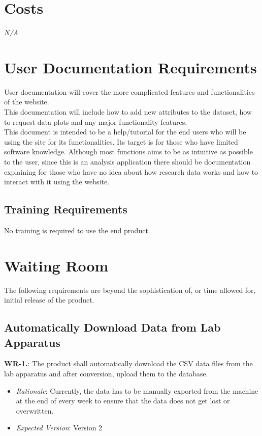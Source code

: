 \documentclass[12pt]{article}
\begin{document}
\section{Costs}
\emph{N/A}
\section{User Documentation Requirements}
User documentation will cover the more complicated features and functionalities of the website.\\

\noindent This documentation will include how to add new attributes to the dataset, how
to request data plots and any major functionality features.\\ \newline
This document is intended to be a help/tutorial for the end users who will be
using the site for its functionalities. Its target is for those who have limited
software knowledge. Although most functions aims to be as intuitive as possible
to the user, since this is an analysis application there should be documentation
explaining for those who have no idea about how research data works and how to
interact with it using the website.

\subsection{Training Requirements}
No training is required to use the end product.
\section{Waiting Room}
The following requirements are beyond the sophistication of, or time allowed for, initial release of the product.
\subsection{Automatically Download Data from Lab Apparatus}
\textbf{WR-1.}: The product shall automatically download the CSV data files from the lab apparatus and after conversion, upload them to the database.
\begin{itemize}
  \item \emph{Rationale}: Currently, the data has to be manually exported from the machine at the end of every week to ensure that the data does not get lost or overwritten.
  \item \emph{Expected Version}: Version 2
\end{itemize}
\end{document}
